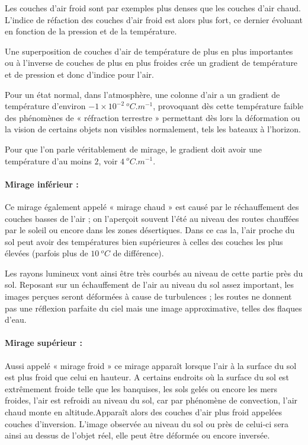 \documentclass[a4paper, 12pt, onecolumn, openany]{report}
\begin{document}
	Les couches d’air froid sont par exemples plus denses que les couches d’air chaud. 
L’indice de réfaction des couches d’air froid est alors plus fort, ce dernier évoluant en fonction de la pression et de la température. 

	Une superposition de couches d’air de température de plus en plus importantes ou à l’inverse de couches de plus en plus froides crée un gradient de température et de pression et donc d’indice pour l’air. 

	Pour un état normal, dans l’atmosphère, une colonne d’air a un gradient de température d’environ $-1\times 10^{-2} ~^{o}C.m^{-1}$, provoquant dès cette température faible des phénomènes de « réfraction terrestre » permettant dès lors la déformation ou la vision de certains objets non visibles normalement, tels les bateaux à l’horizon. 
	
	Pour que l’on parle véritablement de mirage, le gradient doit avoir une température d’au moins $2$, voir $4 ~^{o}C.m^{-1}$. 


\paragraph{Mirage inférieur :}
	Ce mirage également appelé « mirage chaud » est causé par le réchauffement des couches basses de l’air ; on l’aperçoit souvent l’été au niveau des routes chauffées par le soleil ou encore dans les zones désertiques. 
Dans ce cas la, l’air proche du sol peut avoir des températures bien supérieures à celles des couches les plus élevées (parfois plus de $10 ~^{o}C$ de différence).

	Les rayons lumineux vont ainsi être très courbés au niveau de cette partie près du sol. Reposant sur un échauffement de l’air au niveau du sol assez important, les images perçues seront déformées à cause de turbulences ; les routes ne donnent pas une réflexion parfaite du ciel mais une image approximative, telles des flaques d’eau. 

\paragraph{Mirage supérieur :}
	Aussi appelé « mirage froid » ce mirage apparaît lorsque l’air à la surface du sol est plus froid que celui en hauteur.  A certains endroits où la surface du sol est extrêmement froide telle que les banquises, les sols gelés ou encore les mers froides, l’air est refroidi au niveau du sol, car par phénomène de convection, l’air chaud monte en altitude.Apparaît alors des couches d’air plus froid appelées couches d’inversion.  L’image observée au niveau du sol ou près de celui-ci sera ainsi au dessus de l’objet réel, elle peut être déformée ou encore inversée.
	
\end{document}
